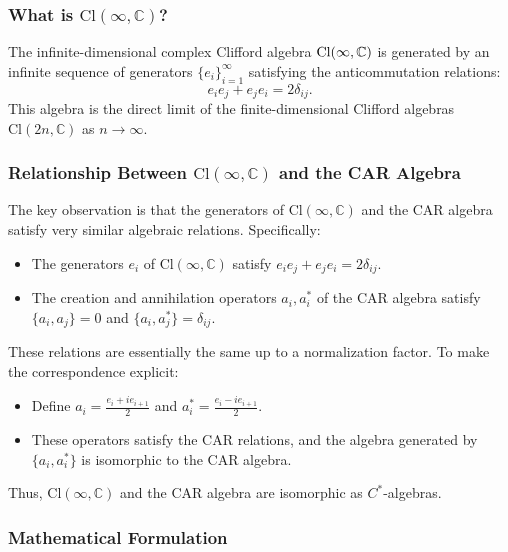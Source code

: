 \documentclass{article}
\begin{document}
\subsubsection{What is $\text{Cl}(\infty, \mathbb{C})$?}

The infinite-dimensional complex Clifford algebra $\text{Cl}(\infty, \mathbb{%
C})$ is generated by an infinite sequence of generators $\{e_i\}_{i=1}^\infty
$ satisfying the anticommutation relations: 
\begin{equation*}
e_i e_j + e_j e_i = 2 \delta_{ij}. 
\end{equation*}
This algebra is the direct limit of the finite-dimensional Clifford algebras 
$\text{Cl}(2n, \mathbb{C})$ as $n \to \infty$.

\subsubsection{Relationship Between $\text{Cl}(\infty, \mathbb{C})$ and the
CAR Algebra}

The key observation is that the generators of $\text{Cl}(\infty, \mathbb{C})$
and the CAR algebra satisfy very similar algebraic relations. Specifically:

\begin{itemize}
\item The generators $e_i$ of $\text{Cl}(\infty, \mathbb{C})$ satisfy $e_i
e_j + e_j e_i = 2 \delta_{ij}$. 

\item The creation and annihilation operators $a_i, a_i^*$ of the CAR
algebra satisfy $\{a_i, a_j\} = 0$ and $\{a_i, a_j^*\} = \delta_{ij}$.
\end{itemize}

These relations are essentially the same up to a normalization factor. To
make the correspondence explicit:

\begin{itemize}
\item Define $a_i = \frac{e_i + i e_{i+1}}{2}$ and $a_i^* = \frac{e_i - i
e_{i+1}}{2}$. 

\item These operators satisfy the CAR relations, and the algebra generated
by $\{a_i, a_i^*\}$ is isomorphic to the CAR algebra.
\end{itemize}

Thus, $\text{Cl}(\infty, \mathbb{C})$ and the CAR algebra are isomorphic as $%
C^*$-algebras.

\subsubsection{Mathematical Formulation}
\end{document}
